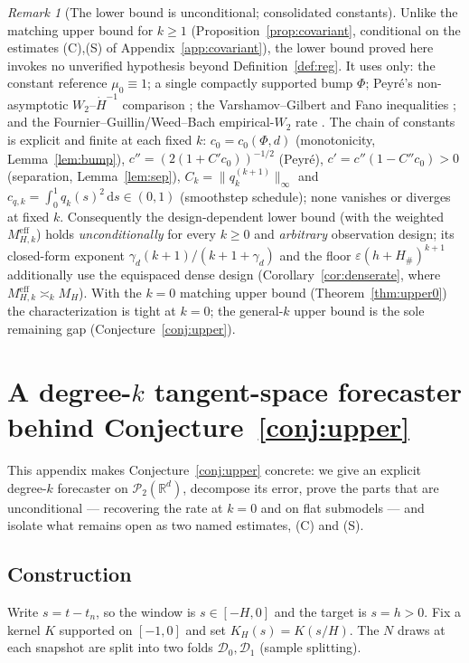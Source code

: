 \documentclass[11pt]{article}
\theoremstyle{definition}
\theoremstyle{remark}
\newtheorem{remark}{Remark}
\newcommand{\R}{\mathbb{R}}
\newcommand{\PP}{\mathcal{P}_2(\R^d)}
\begin{document}
\begin{remark}[The lower bound is unconditional; consolidated constants]\label{rem:lbconstants}
Unlike the matching upper bound for $k\ge1$ (Proposition~\ref{prop:covariant}, conditional on the
estimates (C),(S) of Appendix~\ref{app:covariant}), the lower bound proved here invokes no
unverified hypothesis beyond Definition~\ref{def:reg}. It uses only: the constant reference
$\mu_0\equiv1$; a single compactly supported bump $\Phi$; Peyr\'e's non-asymptotic
$W_2$--$\dot H^{-1}$ comparison \cite{peyre}; the Varshamov--Gilbert and Fano inequalities
\cite{tsybakov}; and the Fournier--Guillin/Weed--Bach empirical-$W_2$ rate \cite{fg,weedbach}. The
chain of constants is explicit and finite at each fixed $k$: $c_0=c_0(\Phi,d)$ (monotonicity,
Lemma~\ref{lem:bump}), $c''=(2(1+C'c_0))^{-1/2}$ (Peyr\'e), $c'=c''(1-C''c_0)>0$ (separation,
Lemma~\ref{lem:sep}), $C_k=\|q_k^{(k+1)}\|_\infty$ and $c_{q,k}=\int_0^1q_k(s)^2\,\mathrm ds\in(0,1)$
(smoothstep schedule); none vanishes or diverges at fixed $k$. Consequently the design-dependent
lower bound (with the weighted $M^{\mathrm{eff}}_{H,k}$) holds \emph{unconditionally} for every
$k\ge0$ and \emph{arbitrary} observation design; its closed-form exponent
$\gamma_d(k+1)/(k+1+\gamma_d)$ and the floor $\varepsilon(h+H_\#)^{k+1}$ additionally use the
equispaced dense design (Corollary~\ref{cor:denserate}, where $M^{\mathrm{eff}}_{H,k}\asymp_k M_H$).
With the $k=0$ matching upper bound (Theorem~\ref{thm:upper0}) the
characterization is tight at $k=0$; the general-$k$ upper bound is the sole remaining gap
(Conjecture~\ref{conj:upper}).
\end{remark}


\section{A degree-$k$ tangent-space forecaster behind Conjecture~\ref{conj:upper}}\label{app:forecaster}

This appendix makes Conjecture~\ref{conj:upper} concrete: we give an explicit degree-$k$
forecaster on $\PP$, decompose its error, prove the parts that are unconditional ---
recovering the rate at $k=0$ and on flat submodels --- and isolate what remains open as two
named estimates, \textup{(C)} and \textup{(S)}.

\subsection{Construction}
Write $s=t-t_n$, so the window is $s\in[-H,0]$ and the target is $s=h>0$. Fix a kernel $K$
supported on $[-1,0]$ and set $K_H(s)=K(s/H)$. The $N$ draws at each snapshot are split into two
folds $\mathcal D_0,\mathcal D_1$ (sample splitting).
\end{document}
